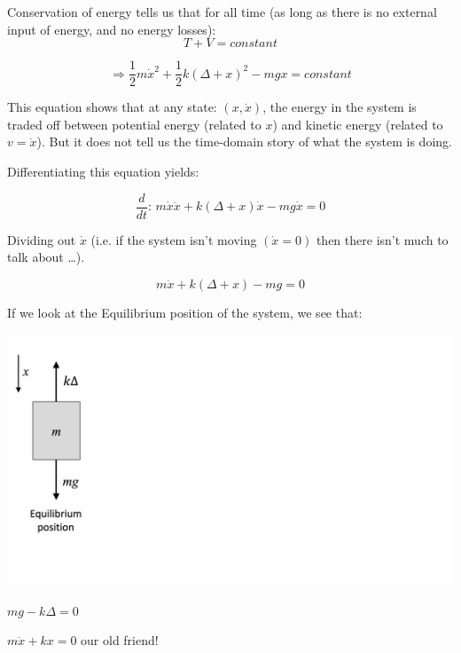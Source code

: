 \documentclass[12pt,letterpaper,twoside]{report}
\begin{document}
Conservation of energy tells us that for all time (as long as there is no external input of energy, and no energy losses):
\[
T+V = constant
\]

\[
\Rightarrow \displaystyle \frac{1}{2} m \dot{x}^2 + \frac{1}{2} k (\Delta + x)^2 - mgx = constant
\]

This equation shows that at any state: $(x, \dot{x})$, the energy in the system is traded off between potential energy (related to $x$) and kinetic energy (related to $v= \dot{x}$).  But it does not tell us the time-domain story of what the system is doing.

Differentiating this equation yields:

\[
\frac{d}{dt} : \, m \dot{x} \ddot{x} + k(\Delta + x) \dot{x} - mg \dot{x} = 0
\]

Dividing out $\dot{x}$ (i.e. if the system isn’t moving $(\dot{x}=0)$ then there isn’t much to talk about …). 

\[
m \ddot{x} + k(\Delta +x) - mg = 0
\]

If we look at the Equilibrium position of the system, we see that:

\begin{minipage}{0.35\textwidth}
\includegraphics[trim={0cm 0cm 22cm 0cm},clip,width=1\textwidth, left]{Slide118}
\end{minipage}
\begin{minipage}{0.65\textwidth}

$mg-k\Delta = 0$

\vspace*{3\baselineskip}

$m \ddot{x} + kx = 0$     \hspace{1cm}    our old friend!  

\end{minipage}
\end{document}
